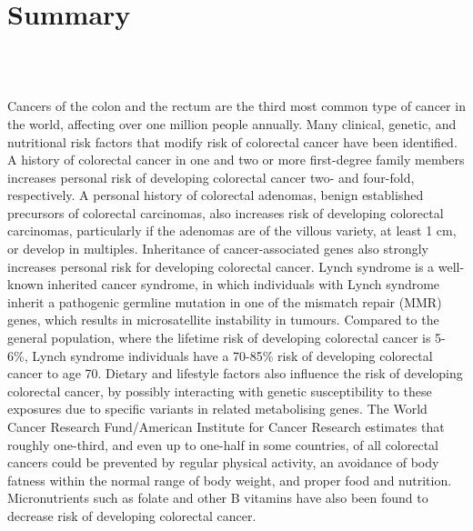 \chapter*{Summary}
\label{summary}


\quad\\

\quad\\

\newpage

\noindent Cancers of the colon and the rectum are the third most common type of cancer in the world, affecting over one million people annually. Many clinical, genetic, and nutritional risk factors that modify risk of colorectal cancer have been identified. A history of colorectal cancer in one and two or more first-degree family members increases personal risk of developing colorectal cancer two- and four-fold, respectively. A personal history of colorectal adenomas, benign established precursors of colorectal carcinomas, also increases risk of developing colorectal carcinomas, particularly if the adenomas are of the villous variety, at least 1 cm, or develop in multiples. Inheritance of cancer-associated genes also strongly increases personal risk for developing colorectal cancer. Lynch syndrome is a well-known inherited cancer syndrome, in which individuals with Lynch syndrome inherit a pathogenic germline mutation in one of the mismatch repair (MMR) genes, which results in microsatellite instability in tumours. Compared to the general population, where the lifetime risk of developing colorectal cancer is 5-6\%, Lynch syndrome individuals have a 70-85\% risk of developing colorectal cancer to age 70. Dietary and lifestyle factors also influence the risk of developing colorectal cancer, by possibly interacting with genetic susceptibility to these exposures due to specific variants in related metabolising genes. The World Cancer Research Fund/American Institute for Cancer Research estimates that roughly one-third, and even up to one-half in some countries, of all colorectal cancers could be prevented by regular physical activity, an avoidance of body fatness within the normal range of body weight, and proper food and nutrition. Micronutrients such as folate and other B vitamins have also been found to decrease risk of developing colorectal cancer.

